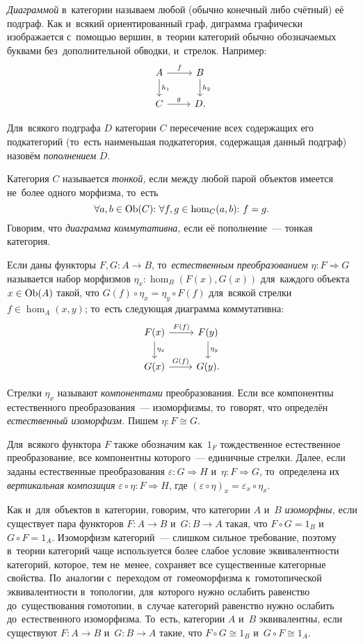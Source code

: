 \documentclass[a4paper,oneside]{article}
\begin{document}
\textit{Диаграммой} в~категории называем любой (обычно конечный либо счётный) её подграф.
Как и~всякий ориентированный граф, диграмма графически изображается с~помощью вершин,
в~теории категорий обычно обозначаемых буквами без~дополнительной обводки, и~стрелок.
Например:
\[
  \begin{tikzcd}
    \arrow{d}{h_1} A \arrow{r}{f} & B \arrow{d}{h_2} \\
                   C \arrow{r}{g} & D.
  \end{tikzcd}
\]

Для~всякого подграфа $D$ категории $C$ пересечение всех содержащих его подкатегорий
(то~есть наименьшая подкатегория, содержащая данный подграф) назовём \textit{пополнением} $\overline{D}$.

Категория $C$ называется \textit{тонкой,} если между любой парой объектов имеется не~более одного морфизма,
то~есть \[ \forall a, b \in \mathrm{Ob}(C){:}\ \forall f, g \in \hom_C(a, b){:}\ f = g. \]
Говорим, что \textit{диаграмма коммутативна,} если её пополнение~— тонкая категория.

Если даны функторы $F, G : A \rightarrow B$, то~\textit{естественным преобразованием} $\eta : F \Rightarrow G$ называется набор морфизмов
$\eta_x : \hom_B(F(x), G(x))$ для~каждого объекта $x \in \mathrm{Ob}(A)$ такой, что $G(f) \circ \eta_x = \eta_y \circ F(f)$
для~всякой стрелки $f \in \hom_A(x, y)$; то~есть следующая диаграмма коммутативна:
\[
  \begin{tikzcd}
    \arrow{d}{\eta_x} F(x) \arrow{r}{F(f)} & F(y) \arrow{d}{\eta_y} \\
                      G(x) \arrow{r}{G(f)} & G(y).
  \end{tikzcd}
\]

Стрелки $\eta_x$ называют \textit{компонентами} преобразования. Если все компонентны естественного
преобразования~— изоморфизмы, то~говорят, что определён \textit{естественный изоморфизм.} Пишем $\eta : F \cong G$.

Для~всякого функтора $F$ также обозначим как~$1_F$ тождественное естественное преобразование, все компонентны которого~— единичные стрелки.
Далее, если заданы естественные преобразования $\varepsilon : G \Rightarrow H$ и~$\eta : F \Rightarrow G$,
то~определена их \textit{вертикальная композиция} $\varepsilon \circ \eta : F \Rightarrow H$,
где $(\varepsilon \circ \eta)_x = \varepsilon_x \circ \eta_x$.

Как и~для~объектов в~категории, говорим, что категории $A$ и~$B$ \textit{изоморфны,} если существует
пара функторов $F : A \rightarrow B$ и~$G : B \rightarrow A$ такая, что $F \circ G = 1_B$ и~$G \circ F = 1_A$.
Изоморфизм категорий~— слишком сильное требование, поэтому в~теории категорий чаще используется более слабое
условие эквивалентности категорий, которое, тем не~менее, сохраняет все существенные категорные свойства.
По~аналогии с~переходом от~гомеоморфизма к~гомотопической эквивалентности в~топологии, для~которого нужно ослабить
равенство до~существования гомотопии, в~случае категорий равенство нужно ослабить до~естественного изоморфизма.
То~есть, категории $A$ и~$B$ эквивалентны, если существуют $F : A \rightarrow B$ и~$G : B \rightarrow A$
такие, что $F \circ G \cong 1_B$ и~$G \circ F \cong 1_A$.
\end{document}

